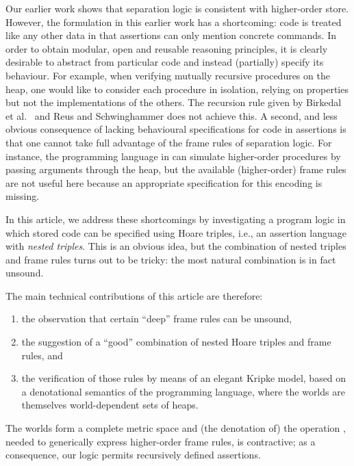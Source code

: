 \documentclass{LMCS}
\theoremstyle{remark}
\begin{document}
Our earlier work \cite{Birkedal:Reus:Schwinghammer:Yang:08,Reus:Schwinghammer:06} shows that separation logic is consistent with higher-order store. However, the formulation in this earlier work has a shortcoming: code is treated like any other data in that  assertions can only mention concrete commands. In order to obtain modular, open and reusable reasoning principles,  it is clearly desirable to abstract from particular code and instead (partially) specify its behaviour. For example, when verifying mutually recursive procedures on the heap, one would like to consider each  procedure in  isolation, relying on properties but not the implementations of the others. The recursion rule given by Birkedal et al.\ \cite{Birkedal:Reus:Schwinghammer:Yang:08} and Reus and Schwinghammer  \cite{Reus:Schwinghammer:06} does not achieve this. 
A second, and less obvious consequence of  lacking  behavioural specifications for code in assertions is that one cannot take full advantage of the frame rules of separation logic. For instance, 
the programming language in \cite{Birkedal:Reus:Schwinghammer:Yang:08} 
can simulate higher-order procedures by passing arguments through the heap, but the available (higher-order) frame rules are not useful here because an appropriate specification for this encoding is missing. 

In this article, we address these shortcomings by investigating a program logic in which stored code can be specified using Hoare triples, i.e., an assertion language with \emph{nested triples}. 
This is an obvious idea, but the combination of nested triples and frame rules turns out to be tricky: the most natural combination is in fact unsound. 

The main technical contributions of this article are therefore: 
\begin{enumerate}[(1)]
\item the observation that certain ``deep'' frame rules can be unsound, 
\item the suggestion of a ``good'' combination of nested Hoare triples and frame rules,  and 
\item the verification of those  rules  by means of   an elegant Kripke model, based on a denotational semantics of the programming language, where the worlds are themselves world-dependent sets of heaps. 
\end{enumerate}
The worlds form a complete metric space and  (the denotation of) the operation , needed to generically express higher-order  frame rules, is contractive; as a consequence, our logic permits recursively defined assertions. 
\end{document}
